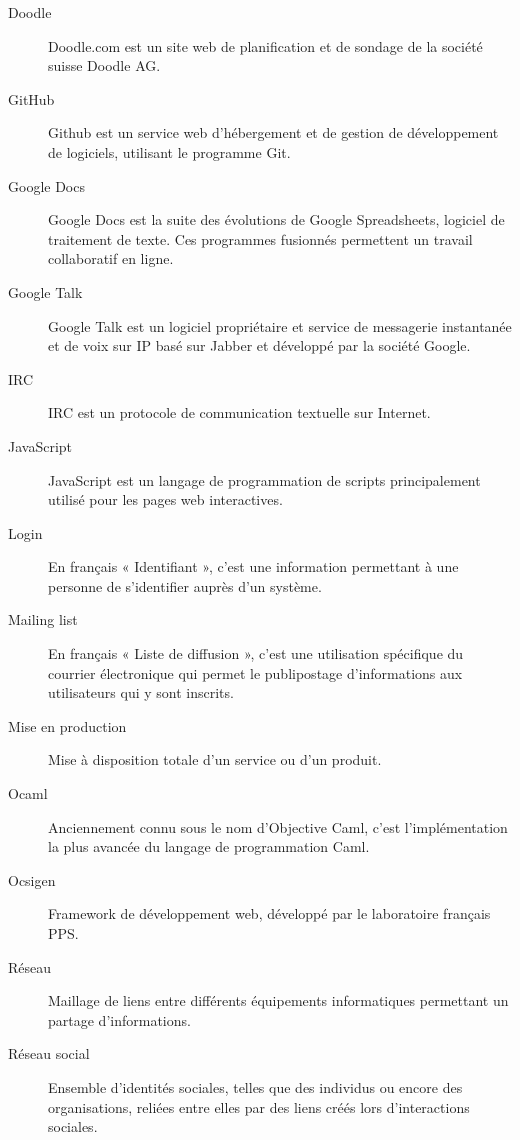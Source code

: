 \documentclass{life-fr}
\begin{document}
\begin{description}
\item[Doodle]
Doodle.com est un site web de planification et de sondage de la société suisse Doodle AG.

\item[GitHub]
Github est un service web d'hébergement et de gestion de développement de logiciels, utilisant le programme Git.

\item[Google Docs]
Google Docs est la suite des évolutions de Google Spreadsheets, logiciel de traitement de texte. Ces programmes fusionnés permettent un travail collaboratif en ligne.

\item[Google Talk]
Google Talk est un logiciel propriétaire et service de messagerie instantanée et de voix sur IP basé sur Jabber et développé par la société Google.

\item[IRC]
IRC est un protocole de communication textuelle sur Internet.

\item[JavaScript]
JavaScript est un langage de programmation de scripts principalement utilisé pour les pages web interactives.

\item[Login]
En français « Identifiant », c'est une information permettant à une personne de s'identifier auprès d'un système.

\item[Mailing list]
En français « Liste de diffusion », c'est une utilisation spécifique du courrier électronique qui permet le publipostage d'informations aux utilisateurs qui y sont inscrits.

\item[Mise en production]
Mise à disposition totale d’un service ou d’un produit.

\item[Ocaml]
Anciennement connu sous le nom d'Objective Caml, c’est l'implémentation la plus avancée du langage de programmation Caml.

\item[Ocsigen]
Framework de développement web, développé par le laboratoire français PPS.

\item[Réseau]
Maillage de liens entre différents équipements informatiques permettant un partage d’informations.

\item[Réseau social]
Ensemble d'identités sociales, telles que des individus ou encore des organisations, reliées entre elles par des liens créés lors d’interactions sociales.


\end{description}
\end{document}
